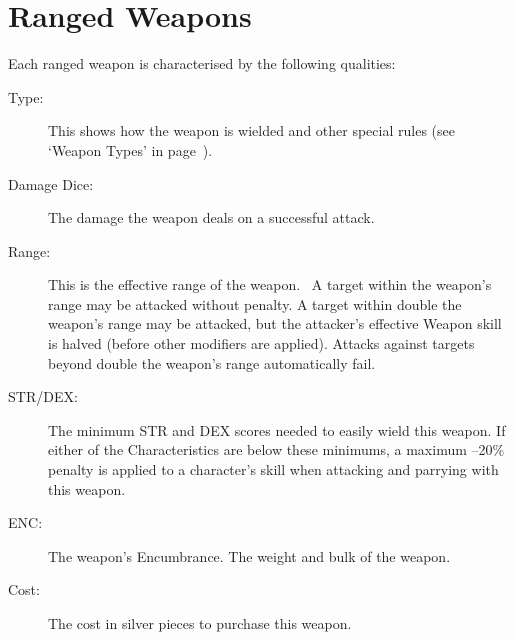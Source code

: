 \section{Ranged Weapons}
Each ranged weapon is characterised by the following qualities:
\begin{description}
	\item[Type:] This shows how the weapon is wielded and other special rules (see `Weapon Types' in page~\pageref{}).
	\item[Damage Dice:] The damage the weapon deals on a successful attack. 
	\item[Range:] This is the effective range of the weapon.  A target within the weapon’s range may be attacked without penalty. A target within double the weapon’s range may be attacked, but the attacker’s effective Weapon skill is halved (before other modifiers are applied). Attacks against targets beyond double the weapon’s range automatically fail.
	\item[STR/DEX:] The minimum STR and DEX scores needed to easily wield this weapon. If either of the Characteristics are below these minimums, a maximum –20\% penalty is applied to a character’s skill when attacking and parrying with this weapon.
	\item[ENC:] The weapon’s Encumbrance. The weight and bulk of the weapon. 
	\item[Cost:] The cost in silver pieces to purchase this weapon.
\end{description}



